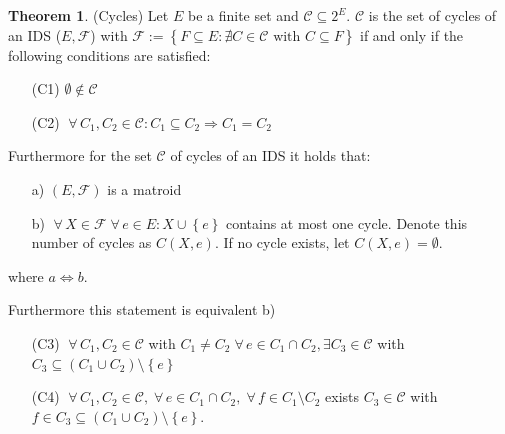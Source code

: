 \documentclass[a4paper]{article}
\theoremstyle{definition}
\newtheorem{theorem}{Theorem}
\newcommand{\set}[1]{\left\{#1\right\}}
\newcommand{\fall}{\;\forall\,}
\begin{document}
\begin{theorem}
  \label{satz-8.8}
  (Cycles)
  Let $E$ be a finite set and $\mathcal{C} \subseteq 2^E$. $\mathcal{C}$ is the set of cycles of an IDS ($E, \mathcal{F}$) with $\mathcal{F} := \set{F \subseteq E: \nexists C \in \mathcal{C} \text{ with } C \subseteq F}$ if and only if the following conditions are satisfied:

  \begin{itemize}
    \item[(C1)] $\emptyset \notin \mathcal{C}$
    \item[(C2)] $\fall C_1, C_2 \in \mathcal{C}: C_1 \subseteq C_2 \Rightarrow C_1 = C_2$
  \end{itemize}

  Furthermore for the set $\mathcal{C}$ of cycles of an IDS it holds that:
  \begin{itemize}
    \item[a)] $(E, \mathcal{F})$ is a matroid
    \item[b)] $\fall X \in \mathcal{F} \fall e \in E: X \cup \set{e}$ contains at most one cycle. Denote this number of cycles as $C(X, e)$. If no cycle exists, let $C(X, e) = \emptyset$.
  \end{itemize}
  where $a \Leftrightarrow b$.

  Furthermore this statement is equivalent b)
  \begin{itemize}
    \item[(C3)] $\fall C_1, C_2 \in \mathcal{C}$ with $C_1 \neq C_2 \fall e \in C_1 \cap C_2, \exists C_3 \in \mathcal{C}$ with $C_3 \subseteq (C_1 \cup C_2) \setminus \set{e}$
    \item[(C4)] $\fall C_1, C_2 \in \mathcal{C}, \fall e \in C_1 \cap C_2, \fall f \in C_1 \setminus C_2$ exists $C_3 \in \mathcal{C}$ with $f \in C_3 \subseteq (C_1 \cup C_2) \setminus \set{e}$.
  \end{itemize}
\end{theorem}
\end{document}
